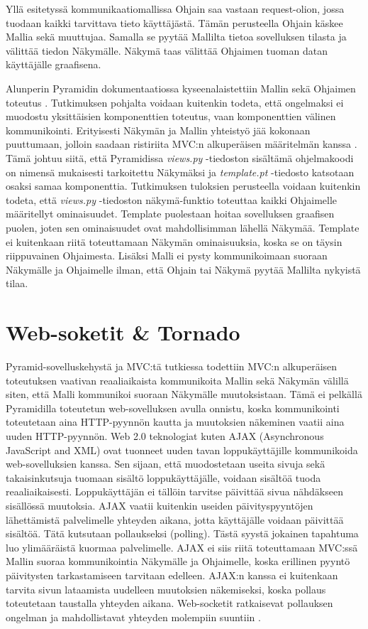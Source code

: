 \documentclass[utf8]{gradu3}
\begin{document}
Yllä esitetyssä kommunikaatiomallissa Ohjain saa vastaan request-olion, jossa tuodaan kaikki tarvittava tieto käyttäjästä. Tämän perusteella Ohjain käskee Mallia
sekä muuttujaa. Samalla se pyytää Mallilta tietoa sovelluksen tilasta ja välittää tiedon Näkymälle. Näkymä taas välittää Ohjaimen tuoman datan käyttäjälle graafisena.

Alunperin Pyramidin dokumentaatiossa kyseenalaistettiin Mallin sekä Ohjaimen toteutus \parencite{pyramid_intr}. Tutkimuksen pohjalta voidaan kuitenkin
todeta, että ongelmaksi ei muodostu yksittäisien komponenttien toteutus, vaan komponenttien välinen kommunikointi. Erityisesti Näkymän ja Mallin yhteistyö jää
kokonaan puuttumaan, jolloin saadaan ristiriita MVC:n alkuperäisen määritelmän kanssa \parencite[s. 1]{reenskaug_orig}. Tämä johtuu siitä, että Pyramidissa \emph{views.py} -tiedoston sisältämä ohjelmakoodi on nimensä mukaisesti tarkoitettu Näkymäksi ja
\emph{template.pt} -tiedosto katsotaan osaksi samaa komponenttia. Tutkimuksen tuloksien perusteella voidaan kuitenkin todeta, että \emph{views.py} -tiedoston näkymä-funktio toteuttaa kaikki
Ohjaimelle määritellyt ominaisuudet. Template puolestaan hoitaa sovelluksen graafisen puolen, joten sen ominaisuudet ovat mahdollisimman lähellä Näkymää. Template ei kuitenkaan riitä toteuttamaan Näkymän ominaisuuksia, koska se on täysin riippuvainen Ohjaimesta. Lisäksi Malli ei pysty kommunikoimaan suoraan Näkymälle ja Ohjaimelle ilman, että Ohjain tai Näkymä pyytää Mallilta nykyistä tilaa.

\chapter{Web-soketit \& Tornado}
Pyramid-sovelluskehystä ja MVC:tä tutkiessa todettiin MVC:n alkuperäisen toteutuksen vaativan reaaliaikaista kommunikoita Mallin sekä Näkymän välillä siten, että Malli kommunikoi suoraan Näkymälle muutoksistaan. Tämä ei pelkällä Pyramidilla toteutetun web-sovelluksen avulla onnistu, koska kommunikointi toteutetaan aina HTTP-pyynnön kautta ja muutoksien näkeminen vaatii aina uuden HTTP-pyynnön. Web 2.0 teknologiat kuten AJAX (Asynchronous JavaScript and XML) ovat tuonneet uuden tavan loppukäyttäjille kommunikoida web-sovelluksien kanssa. Sen sijaan, että muodostetaan useita sivuja sekä takaisinkutsuja tuomaan sisältö loppukäyttäjälle, voidaan sisältöä tuoda reaaliaikaisesti. Loppukäyttäjän ei tällöin tarvitse päivittää sivua nähdäkseen sisällössä muutoksia. AJAX vaatii kuitenkin useiden päivityspyyntöjen lähettämistä palvelimelle yhteyden aikana, jotta käyttäjälle voidaan päivittää sisältöä. Tätä kutsutaan pollaukseksi (polling). Tästä syystä jokainen tapahtuma luo ylimääräistä kuormaa palvelimelle\parencite{websocket_ajax}. AJAX ei siis riitä toteuttamaan MVC:ssä Mallin suoraa kommunikointia Näkymälle ja Ohjaimelle, koska erillinen pyyntö päivitysten tarkastamiseen tarvitaan edelleen. AJAX:n kanssa ei kuitenkaan tarvita sivun lataamista uudelleen muutoksien näkemiseksi, koska pollaus toteutetaan taustalla yhteyden aikana.  Web-socketit ratkaisevat pollauksen ongelman ja mahdollistavat yhteyden molempiin suuntiin \parencite[s. 1.1]{websocket}.
\end{document}
